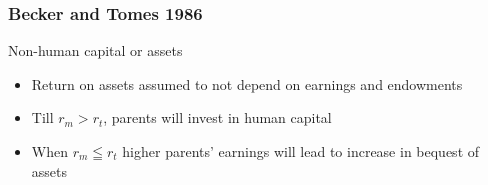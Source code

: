 \documentclass{beamer}
\begin{document}

\begin{frame}
\frametitle{Becker and Tomes 1986}
Non-human capital or assets \\
\begin{itemize}

\item Return on assets assumed to not depend on earnings and endowments
\item Till $r_{m} > r_{t}$, parents will invest in human capital
\item When $r_{m} \leqq r_{t}$ higher parents' earnings will lead to increase in bequest of assets
\end{itemize}
\end{frame}



\end{document}
